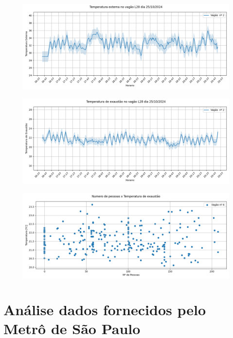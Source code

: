 \documentclass[acronym,symbols,table]{fei}
\begin{document}
\begin{figure}[!htb]
    \centering
    \caption{}
    \includegraphics[width=0.8\linewidth]{Imagens/Temperatura_externa_no_vagao_L28__dia_25102024.png}
    \label{fig:}
\end{figure}

\begin{figure}[!htb]
    \centering
    \caption{}
    \includegraphics[width=0.8\linewidth]{Imagens/Temperatura_de_exaustao_no_vagao_L28__dia_25102024.png}
    \label{fig:}
\end{figure}

\begin{figure}[!htb]
    \centering
    \caption{}
    \includegraphics[width=0.8\linewidth]{Imagens/Coletados_Numero_de_pessoas_x_Temperatura_de_exaustao.png}
    \label{fig:}
\end{figure}

\newpage

\section{Análise dados fornecidos pelo Metrô de São Paulo}
\end{document}
